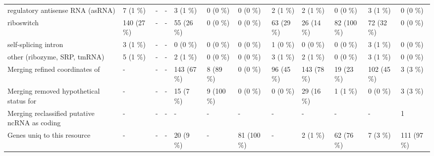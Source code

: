 {\begin{tabular}{llllllllllll}
\hspace{1em}regulatory antisense RNA (asRNA) & 7 (1 \%) & - & - & 3 (1 \%) & 0 (0 \%) & 0 (0 \%) & 2 (1 \%) & 2 (1 \%) & 0 (0 \%) & 3 (1 \%) & 0 (0 \%)\\
\hspace{1em}riboswitch & 140 (27 \%) & - & - & 55 (26 \%) & 0 (0 \%) & 0 (0 \%) & 63 (29 \%) & 26 (14 \%) & 82 (100 \%) & 72 (32 \%) & 0 (0 \%)\\
\hspace{1em}self-splicing intron & 3 (1 \%) & - & - & 0 (0 \%) & 0 (0 \%) & 0 (0 \%) & 1 (0 \%) & 0 (0 \%) & 0 (0 \%) & 3 (1 \%) & 0 (0 \%)\\
\hspace{1em}other (ribozyme, SRP, tmRNA) & 5 (1 \%) & - & - & 2 (1 \%) & 0 (0 \%) & 0 (0 \%) & 3 (1 \%) & 2 (1 \%) & 0 (0 \%) & 3 (1 \%) & 0 (0 \%)\\
Merging refined coordinates of & - & - & - & 143 (67 \%) & 8 (89 \%) & 0 (0 \%) & 96 (45 \%) & 143 (78 \%) & 19 (23 \%) & 102 (45 \%) & 3 (3 \%)\\
Merging removed hypothetical status for & - & - & - & 15 (7 \%) & 9 (100 \%) & 0 (0 \%) & 0 (0 \%) & 29 (16 \%) & 1 (1 \%) & 0 (0 \%) & 3 (3 \%)\\
Merging reclassified putative ncRNA as coding & - & - & - & - & - & - & - & - & - & - & 1\\
Genes uniq to this resource & - & - & - & 20 (9 \%) & - & 81 (100 \%) & - & 2 (1 \%) & 62 (76 \%) & 7 (3 \%) & 111 (97 \%)\\
\bottomrule
\end{tabular}}
